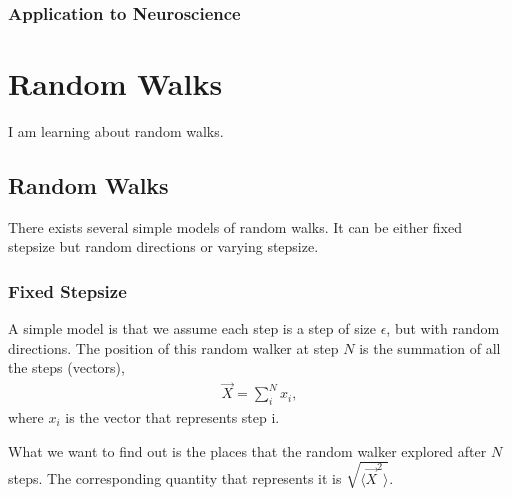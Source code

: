 \documentclass[letterpaper,10pt,english]{sphinxmanual}
\begin{document}
\subsection{Application to Neuroscience}
\label{\detokenize{equation-solving-in-neuroscience/laplace-transform:application-to-neuroscience}}

\chapter{Random Walks}
\label{\detokenize{random-walks/index::doc}}\label{\detokenize{random-walks/index:random-walks}}
I am learning about random walks.



\section{Random Walks}
\label{\detokenize{random-walks/random-walks::doc}}\label{\detokenize{random-walks/random-walks:random-walks}}
There exists several simple models of random walks. It can be either fixed stepsize but random directions or varying stepsize.


\subsection{Fixed Stepsize}
\label{\detokenize{random-walks/random-walks:fixed-stepsize}}
A simple model is that we assume each step is a step of size \(\epsilon\), but with random directions. The position of this random walker at step \(N\) is the summation of all the steps (vectors),
\begin{equation*}
\begin{split}\vec X = \sum_i^N x_i,\end{split}
\end{equation*}
where \(x_i\) is the vector that represents step i.

What we want to find out is the places that the random walker explored after \(N\) steps. The corresponding quantity that represents it is \(\sqrt{\langle \vec X^2 \rangle}\).
\end{document}
